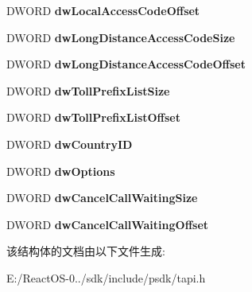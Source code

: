 \begin{DoxyCompactItemize}
\item 
\mbox{\label{structlinelocationentry__tag_a6cad8a88c2b527727ba2ad976af4eeee}} 
D\+W\+O\+RD {\bfseries dw\+Local\+Access\+Code\+Offset}
\item 
\mbox{\label{structlinelocationentry__tag_a8c3228f07da8cb7a2a4cdd7ff8019ae5}} 
D\+W\+O\+RD {\bfseries dw\+Long\+Distance\+Access\+Code\+Size}
\item 
\mbox{\label{structlinelocationentry__tag_a92ef272d1fe5642dc21d8e8df28e3e7f}} 
D\+W\+O\+RD {\bfseries dw\+Long\+Distance\+Access\+Code\+Offset}
\item 
\mbox{\label{structlinelocationentry__tag_a548a413252a5a051b5ef10faa22a0376}} 
D\+W\+O\+RD {\bfseries dw\+Toll\+Prefix\+List\+Size}
\item 
\mbox{\label{structlinelocationentry__tag_a11db805cc91e053a8c314027ac7aac39}} 
D\+W\+O\+RD {\bfseries dw\+Toll\+Prefix\+List\+Offset}
\item 
\mbox{\label{structlinelocationentry__tag_aa8e1af8c78995b314ac24aaaaeb2cffa}} 
D\+W\+O\+RD {\bfseries dw\+Country\+ID}
\item 
\mbox{\label{structlinelocationentry__tag_aeebdf7f2291efc30c709641d948534f3}} 
D\+W\+O\+RD {\bfseries dw\+Options}
\item 
\mbox{\label{structlinelocationentry__tag_a8f77682e5c2eeb3baac6586689888244}} 
D\+W\+O\+RD {\bfseries dw\+Cancel\+Call\+Waiting\+Size}
\item 
\mbox{\label{structlinelocationentry__tag_ab69b0969abb0566cb590a2606ebbff9f}} 
D\+W\+O\+RD {\bfseries dw\+Cancel\+Call\+Waiting\+Offset}
\end{DoxyCompactItemize}


该结构体的文档由以下文件生成\+:\begin{DoxyCompactItemize}
\item 
E\+:/\+React\+O\+S-\/0../sdk/include/psdk/tapi.\+h\end{DoxyCompactItemize}
